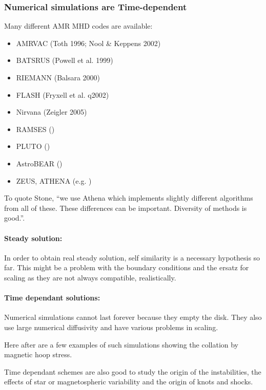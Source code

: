 \documentclass[10pt,a4paper,english]{article}
\begin{document}
\subsubsection{Numerical simulations are Time-dependent}

Many different AMR MHD codes are available:
\begin{itemize}
    \item AMRVAC (Toth 1996; Nool \& Keppens 2002)
    \item BATSRUS (Powell et al. 1999)
    \item RIEMANN (Balsara 2000)
    \item FLASH (Fryxell et al. q2002)
    \item Nirvana (Zeigler 2005)
    \item RAMSES (\cite{2006A&A...457..371F})
    \item PLUTO (\cite{2006MNRAS.368.1040M})
    \item AstroBEAR (\cite{2008PhDT.........2C})
    \item ZEUS, ATHENA (e.g. \cite{1990IAUS..140..351S})
\end{itemize}

To quote Stone, ``we use Athena which implements slightly different algorithms
from all of these. These differences can be important. Diversity of methods is
good.''.

\paragraph{Steady solution:}

In order to obtain real steady solution, self similarity is a necessary
hypothesis so far. This might be a problem with the boundary conditions and the
ersatz for scaling as they are not always compatible, realistically.

\paragraph{Time dependant solutions:}

Numerical simulations cannot last forever because they empty the disk. They
also use large numerical diffusivity and have various problems in scaling.

Here after are a few examples of such simulations showing the collation by
magnetic hoop stress.

Time dependant schemes are also good to study the origin of the instabilities,
the effects of star or magnetospheric variability and the origin of knots and
shocks.
\end{document}
